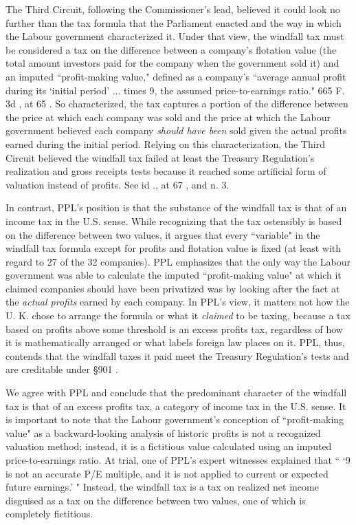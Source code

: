\begin{select}
The Third Circuit, following the Commissioner's lead, believed it could look no further than the tax formula that the Parliament enacted and the way in which the Labour government characterized it. Under that view, the windfall tax must be considered a tax on the difference between a company's flotation value (the total amount investors paid for the company when the government sold it) and an imputed ``profit-making value," defined as a company's ``average annual profit during its `initial period' ... times 9, the assumed price-to-earnings ratio." 665 F. 3d , at 65 . So characterized, the tax captures a portion of the difference between the price at which each company was sold and the price at which the Labour government believed  each company \emph{should have been} sold given the actual profits earned during the initial period. Relying on this characterization, the Third Circuit believed the windfall tax failed at least the Treasury Regulation's realization and gross receipts tests because it reached some artificial form of valuation instead of profits. See id ., at 67 , and n. 3.

In contrast, PPL's position is that the substance of the windfall tax is that of an income tax in the U.S. sense. While recognizing that the tax ostensibly is based on the difference between two values, it argues that every ``variable" in the windfall tax formula except for profits and flotation value is fixed (at least with regard to 27 of the 32 companies). PPL emphasizes that the only way the Labour government was able to calculate the imputed ``profit-making value" at which it claimed companies should have been privatized was by looking after the fact at the \emph{actual profits} earned by each company. In PPL's view, it matters not how the U. K. chose to arrange the formula or what it \emph{claimed} to be taxing, because a tax based on profits above some threshold is an excess profits tax, regardless of how it is mathematically arranged or what labels foreign law places on it. PPL, thus, contends that the windfall taxes it paid meet the Treasury Regulation's tests and are creditable under \S901 .

We agree with PPL and conclude that the predominant character of the windfall tax is that of an excess profits tax, a category of income tax in the U.S. sense. It is important to note that the Labour government's conception of ``profit-making value" as a backward-looking analysis of historic profits is not a recognized valuation method; instead, it is a fictitious value calculated using an imputed price-to-earnings ratio. At trial, one of PPL's expert witnesses explained that `` `9 is not an accurate P/E multiple, and it is not applied to current or expected future earnings.' "  Instead, the windfall tax is a tax on realized net income disguised as a tax on the difference between two values, one of which is completely fictitious.  


\end{select}
